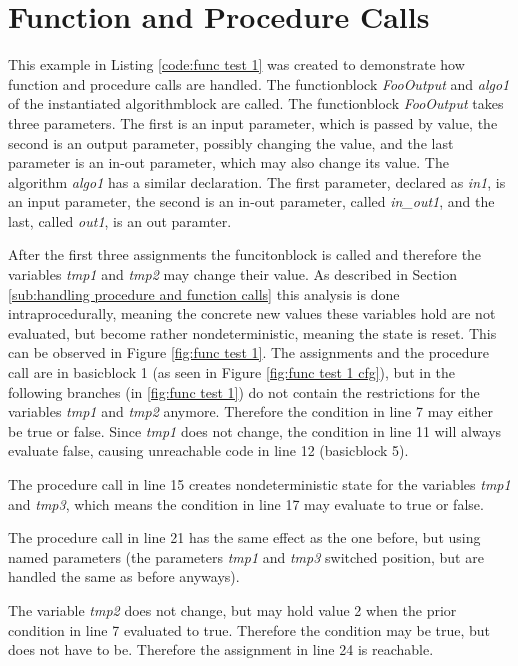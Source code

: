 \section{Function and Procedure Calls}
This example in Listing \ref{code:func test 1} was created to demonstrate how function and procedure calls are handled. The functionblock \emph{FooOutput} and \emph{algo1} of the instantiated algorithmblock are called. The functionblock \emph{FooOutput} takes three parameters. The first is an input parameter, which is passed by value, the second is an output parameter, possibly changing the value, and the last parameter is an in-out parameter, which may also change its value.
The algorithm \emph{algo1} has a similar declaration. The first parameter, declared as \emph{in1}, is an input parameter, the second is an in-out parameter, called \emph{in\_out1}, and the last, called \emph{out1}, is an out paramter.

After the first three assignments the funcitonblock is called and therefore the variables \emph{tmp1} and \emph{tmp2} may change their value. As described in Section \ref{sub:handling procedure and function calls} this analysis is done intraprocedurally, meaning the concrete new values these variables hold are not evaluated, but become rather nondeterministic, meaning the state is reset. This can be observed in Figure \ref{fig:func test 1}. The assignments and the procedure call are in basicblock 1 (as seen in Figure \ref{fig:func test 1 cfg}), but in the following branches (in \ref{fig:func test 1}) do not contain the restrictions for the variables \emph{tmp1} and \emph{tmp2} anymore. Therefore the condition in line 7 may either be true or false.
Since \emph{tmp1} does not change,  the condition in line 11 will always evaluate false, causing unreachable code in line 12 (basicblock 5).

The procedure call in line 15 creates nondeterministic state for the variables \emph{tmp1} and \emph{tmp3}, which means the condition in line 17 may evaluate to true or false.

The procedure call in line 21 has the same effect as the one before, but using named parameters (the parameters \emph{tmp1} and \emph{tmp3} switched position, but are handled the same as before anyways).

The variable \emph{tmp2} does not change, but may hold value 2 when the prior condition in line 7 evaluated to true. Therefore the condition may be true, but does not have to be. Therefore the assignment in line 24 is reachable. 

